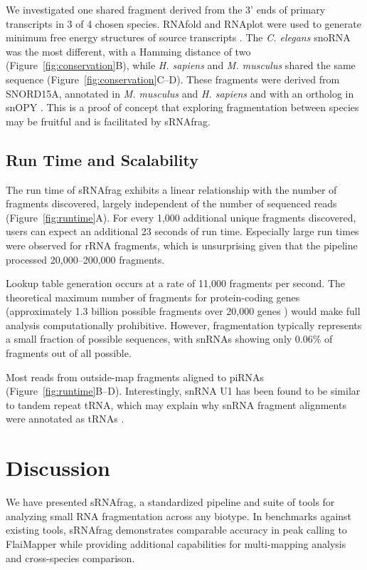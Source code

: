 \documentclass[11pt]{article}
\begin{document}
We investigated one shared fragment derived from the 3' ends of primary transcripts in 3 of 4 chosen species. RNAfold and RNAplot were used to generate minimum free energy structures of source transcripts \citep{Lorenz2011}. The \textit{C. elegans} snoRNA was the most different, with a Hamming distance of two (Figure~\ref{fig:conservation}B), while \textit{H. sapiens} and \textit{M. musculus} shared the same sequence (Figure~\ref{fig:conservation}C--D). These fragments were derived from SNORD15A, annotated in \textit{M. musculus} and \textit{H. sapiens} and with an ortholog in snOPY \citep{Yoshihama2013}. This is a proof of concept that exploring fragmentation between species may be fruitful and is facilitated by sRNAfrag.

\subsection{Run Time and Scalability}

The run time of sRNAfrag exhibits a linear relationship with the number of fragments discovered, largely independent of the number of sequenced reads (Figure~\ref{fig:runtime}A). For every 1,000 additional unique fragments discovered, users can expect an additional 23 seconds of run time. Especially large run times were observed for rRNA fragments, which is unsurprising given that the pipeline processed 20,000--200,000 fragments.

Lookup table generation occurs at a rate of 11,000 fragments per second. The theoretical maximum number of fragments for protein-coding genes (approximately 1.3 billion possible fragments over 20,000 genes \citep{Piovesan2021}) would make full analysis computationally prohibitive. However, fragmentation typically represents a small fraction of possible sequences, with snRNAs showing only 0.06\% of fragments out of all possible.

Most reads from outside-map fragments aligned to piRNAs (Figure~\ref{fig:runtime}B--D). Interestingly, snRNA U1 has been found to be similar to tandem repeat tRNA, which may explain why snRNA fragment alignments were annotated as tRNAs \citep{Marz1985}.

\section{Discussion}

We have presented sRNAfrag, a standardized pipeline and suite of tools for analyzing small RNA fragmentation across any biotype. In benchmarks against existing tools, sRNAfrag demonstrates comparable accuracy in peak calling to FlaiMapper while providing additional capabilities for multi-mapping analysis and cross-species comparison.
\end{document}
